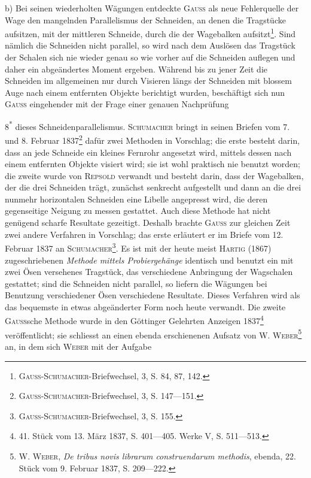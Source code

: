 b) Bei seinen wiederholten Wägungen entdeckte \textsc{Gauss} als neue Fehlerquelle
der Wage den mangelnden Parallelismus der Schneiden, an denen die
Tragstücke aufsitzen, mit der mittleren Schneide, durch die der Wagebalken
aufsitzt\footnote{\textsc{Gauss-Schumacher}-Briefwechsel, 3, S. 84, 87, 142.}. Sind nämlich die Schneiden nicht parallel, so wird nach dem
Auslösen das Tragstück der Schalen sich nie wieder genau so wie vorher auf
die Schneiden auflegen und daher ein abgeändertes Moment ergeben. Während
bis zu jener Zeit die Schneiden im allgemeinen nur durch Visieren längs der
Schneiden mit blossem Auge nach einem entfernten Objekte berichtigt wurden,
beschäftigt sich nun \textsc{Gauss} eingehender mit der Frage einer genauen Nachprüfung
\par\noindent\hfill 8\textsuperscript{*}
\clearpage{}
\noindent dieses Schneidenparallelismus. \textsc{Schumacher} bringt in seinen Briefen
vom 7. und 8. Februar 1837\footnote{\textsc{Gauss-Schumacher}-Briefwechsel, 3, S. 147—151.} dafür zwei Methoden in Vorschlag; die erste
besteht darin, dass an jede Schneide ein kleines Fernrohr angesetzt wird, mittels
dessen nach einem entfernten Objekte visiert wird; sie ist wohl praktisch nie
benutzt worden; die zweite wurde von \textsc{Repsold} verwandt und besteht darin,
dass der Wagebalken, der die drei Schneiden trägt, zunächst senkrecht aufgestellt
und dann an die drei nunmehr horizontalen Schneiden eine Libelle
angepresst wird, die deren gegenseitige Neigung zu messen gestattet. Auch
diese Methode hat nicht genügend scharfe Resultate gezeitigt. Deshalb brachte
\textsc{Gauss} zur gleichen Zeit zwei andere Verfahren in Vorschlag; das erste erläutert
er im Briefe vom 12. Februar 1837 an \textsc{Schumacher}\footnote{\textsc{Gauss-Schumacher}-Briefwechsel, 3, S. 155.}. Es ist mit der
heute meist \textsc{Hartig} (1867) zugeschriebenen \textit{Methode mittels Probiergehänge} identisch
und benutzt ein mit zwei Ösen versehenes Tragstück, das verschiedene
Anbringung der Wagschalen gestattet; sind die Schneiden nicht parallel, so
liefern die Wägungen bei Benutzung verschiedener Ösen verschiedene Resultate.
Dieses Verfahren wird als das bequemste in etwas abgeänderter Form
noch heute verwandt. Die zweite \textsc{Gauss}sche Methode wurde in den Göttinger
Gelehrten Anzeigen 1837\footnote{41. Stück vom 13. März 1837, S. 401—405. Werke V, S. 511—513.} veröffentlicht; sie schliesst an einen ebenda erschienenen
Aufsatz von \textsc{W. Weber}\footnote{\textsc{W. Weber}, \textit{De tribus novis librarum construendarum methodis}, ebenda, 22. Stück vom 9. Februar 1837, S. 209—222.} an, in dem sich \textsc{Weber} mit der Aufgabe

